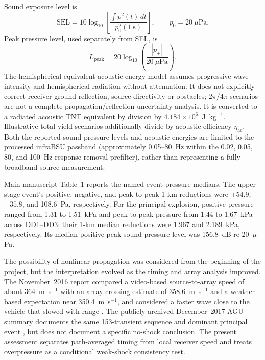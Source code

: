\documentclass[]{seismica}
\begin{document}
Sound exposure level is
\begin{equation}
 \mathrm{SEL}=10\log_{10}\left[
 \frac{\int p^2(t)\,dt}{p_0^2(1~\mathrm{s})}\right],
 \qquad p_0=20~\mu\mathrm{Pa}.
\end{equation}
Peak pressure level, used separately from SEL, is
\begin{equation}
 L_{\mathrm{peak}}=20\log_{10}\left(\frac{|p_+|}{20~\mu\mathrm{Pa}}\right).
\end{equation}
The hemispherical-equivalent acoustic-energy model assumes progressive-wave
intensity and hemispherical radiation without attenuation. It does not
explicitly correct receiver ground reflection, source directivity or obstacles;
$2\pi/4\pi$ scenarios are not a complete propagation/reflection uncertainty
analysis. It is
converted to a radiated acoustic TNT equivalent by division by
$4.184\times10^6$~J~kg$^{-1}$. Illustrative total-yield scenarios additionally
divide by acoustic efficiency $\eta_{\mathrm{ac}}$. Both the reported sound
pressure levels and acoustic energies are limited to the processed infraBSU
passband (approximately 0.05--80~Hz within the 0.02, 0.05, 80, and 100~Hz
response-removal prefilter), rather than representing a fully broadband source
measurement.

Main-manuscript Table~1 reports the named-event pressure medians. The
upper-stage event's positive, negative, and peak-to-peak 1-km reductions were
+54.9, $-35.8$, and 108.6~Pa, respectively. For the principal explosion,
positive pressure ranged from 1.31 to 1.51~kPa and peak-to-peak pressure from
1.44 to 1.67~kPa across DD1--DD3; their 1-km median reductions were 1.967 and
2.189~kPa, respectively. Its median positive-peak sound pressure level was
156.8~dB re 20~$\mu$Pa.

The possibility of nonlinear propagation was considered from the beginning
of the project, but the interpretation evolved as the timing and array
analysis improved. The November~2016 report compared a video-based
source-to-array speed of about 364~m~s$^{-1}$ with an array-crossing estimate
of 358.6~m~s$^{-1}$ and a weather-based expectation near 350.4~m~s$^{-1}$,
and considered a faster wave close to the vehicle that slowed with range
\citep{thompson_mcnutt_fireball_2016}. The publicly archived December~2017 AGU summary documents the same
153-transient sequence and dominant principal event
\citep{thompson_agu_falcon9_2017}, but does not document a specific no-shock
conclusion. The present assessment separates path-averaged timing from local
receiver speed and treats overpressure as a conditional weak-shock
consistency test.
\end{document}
